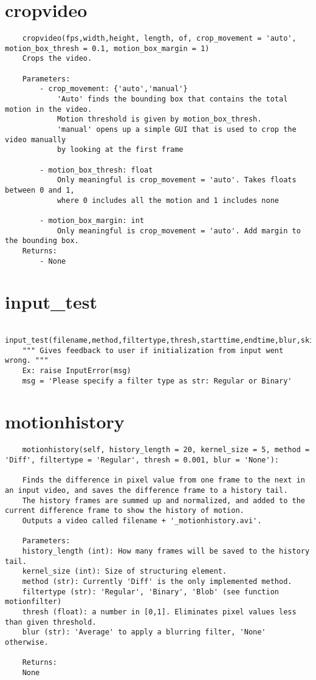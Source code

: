 \documentclass[9pt]{extarticle}
\begin{document}
\section*{cropvideo}
    \begin{verbatim}
    cropvideo(fps,width,height, length, of, crop_movement = 'auto', motion_box_thresh = 0.1, motion_box_margin = 1)
	Crops the video.

	Parameters:
		- crop_movement: {'auto','manual'}
			'Auto' finds the bounding box that contains the total motion in the video.
			Motion threshold is given by motion_box_thresh.
			'manual' opens up a simple GUI that is used to crop the video manually 
			by looking at the first frame

		- motion_box_thresh: float
			Only meaningful is crop_movement = 'auto'. Takes floats between 0 and 1, 
			where 0 includes all the motion and 1 includes none
		
		- motion_box_margin: int
			Only meaningful is crop_movement = 'auto'. Add margin to the bounding box.
	Returns:
		- None
    \end{verbatim}

\section*{input_test}
    \begin{verbatim}
    input_test(filename,method,filtertype,thresh,starttime,endtime,blur,skip):
    """ Gives feedback to user if initialization from input went wrong. """
    Ex: raise InputError(msg)
    msg = 'Please specify a filter type as str: Regular or Binary'
    \end{verbatim}

\section*{motionhistory} 
    \begin{verbatim}
    motionhistory(self, history_length = 20, kernel_size = 5, method = 'Diff', filtertype = 'Regular', thresh = 0.001, blur = 'None'):

    Finds the difference in pixel value from one frame to the next in an input video, and saves the difference frame to a history tail. 
    The history frames are summed up and normalized, and added to the current difference frame to show the history of motion. 
    Outputs a video called filename + '_motionhistory.avi'.

    Parameters:
    history_length (int): How many frames will be saved to the history tail.
    kernel_size (int): Size of structuring element.
    method (str): Currently 'Diff' is the only implemented method. 
    filtertype (str): 'Regular', 'Binary', 'Blob' (see function motionfilter) 
	thresh (float): a number in [0,1]. Eliminates pixel values less than given threshold.
    blur (str): 'Average' to apply a blurring filter, 'None' otherwise.

    Returns:
    None
    \end{verbatim}
\end{document}
